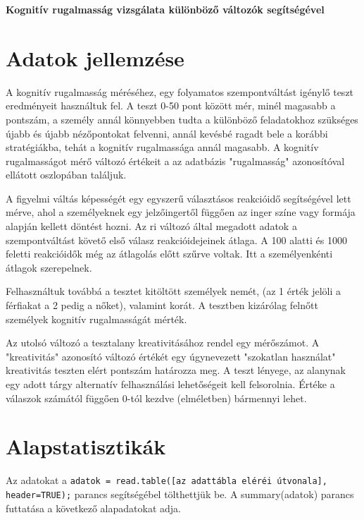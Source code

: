 \documentclass[oneside,titlepage,12pt,a4paper]{report}
\begin{document}
\begin{center}
	\LARGE \textbf{Kognitív rugalmasság vizsgálata különböző változók segítségével}  \\[1.9cm]
\end{center}


\section*{Adatok jellemzése}

A kognitív rugalmasság méréséhez, egy folyamatos szempontváltást igénylő teszt eredményeit használtuk fel. A teszt 0-50 pont között mér, minél magasabb a pontszám, a személy annál könnyebben tudta a különböző feladatokhoz szükséges újabb és újabb nézőpontokat felvenni, annál kevésbé ragadt bele a korábbi stratégiákba, tehát a kognitív rugalmassága annál magasabb. A kognitív rugalmasságot mérő változó értékeit a az adatbázis "rugalmasság" azonosítóval ellátott oszlopában találjuk. 
\par  A figyelmi váltás képességét egy egyszerű választásos reakcióidő segítségével lett mérve, ahol a személyeknek egy jelzőingertől függően az inger színe vagy formája alapján kellett döntést hozni. Az ri változó által megadott adatok a szempontváltást követő első válasz reakcióidejeinek átlaga. A 100 alatti és 1000 feletti reakcióidők még az átlagolás előtt szűrve voltak. Itt a személyenkénti átlagok szerepelnek.
\par Felhasználtuk továbbá a tesztet kitöltött személyek nemét, (az 1 érték jelöli a férfiakat a 2 pedig a nőket), valamint korát. A tesztben kizárólag felnőtt személyek kognitív rugalmasságát mérték. 
\par Az utolsó változó a tesztalany kreativitásához rendel egy mérőszámot. A "kreativitás" azonosító változó értékét egy úgynevezett "szokatlan használat" kreativitás teszten elért pontszám határozza meg. A teszt lényege, az alanynak egy adott tárgy alternatív felhasználási lehetőségeit kell felsorolnia. Értéke a válaszok számától függően 0-tól kezdve (elméletben) bármennyi lehet.

\section*{Alapstatisztikák}

Az adatokat a \texttt{adatok = read.table([az adattábla eléréi útvonala], header=TRUE);} parancs segítségébel tölthettjük be.
A  summary(adatok) parancs futtatása a  következő  alapadatokat  adja.
\end{document}
